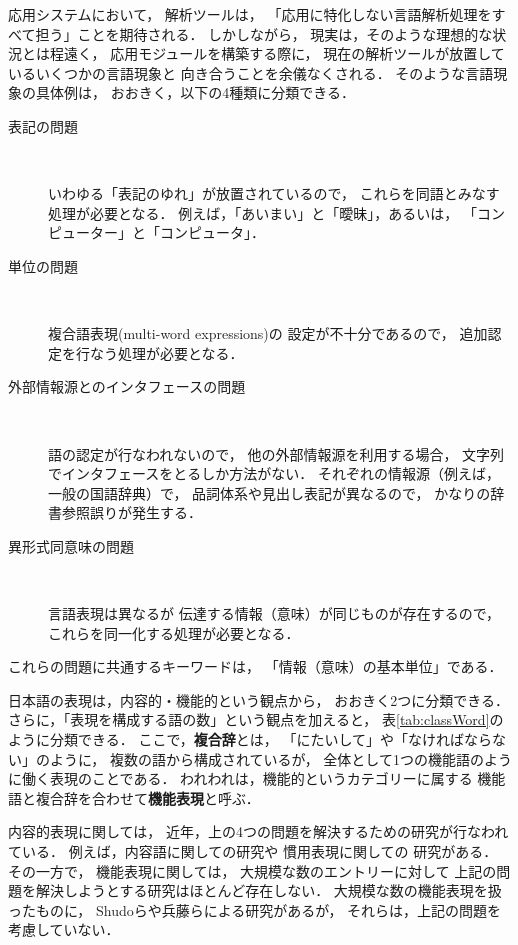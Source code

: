 \documentclass[japanese]{jnlp_1.3e}
\begin{document}
応用システムにおいて，
解析ツールは，
「応用に特化しない言語解析処理をすべて担う」ことを期待される．
しかしながら，
現実は，そのような理想的な状況とは程遠く，
応用モジュールを構築する際に，
現在の解析ツールが放置しているいくつかの言語現象と
向き合うことを余儀なくされる．
そのような言語現象の具体例は，
おおきく，以下の4種類に分類できる．
\begin{description}
 \item[表記の問題] ~~

            いわゆる「表記のゆれ」が放置されているので，
            これらを同語とみなす処理が必要となる．
            例えば，「あいまい」と「曖昧」，あるいは，
            「コンピューター」と「コンピュータ」．            
 \item[単位の問題] ~~

            複合語表現(multi-word expressions)の
            設定が不十分であるので，
            追加認定を行なう処理が必要となる．
 \item[外部情報源とのインタフェースの問題] ~~

            語の認定が行なわれないので，
	    他の外部情報源を利用する場合，
	    文字列でインタフェースをとるしか方法がない．
	    それぞれの情報源（例えば，一般の国語辞典）で，
	    品詞体系や見出し表記が異なるので，
	    かなりの辞書参照誤りが発生する．
 \item[異形式同意味の問題] ~~

            言語表現は異なるが
            伝達する情報（意味）が同じものが存在するので，
            これらを同一化する処理が必要となる．
\end{description}
これらの問題に共通するキーワードは，
「情報（意味）の基本単位」である．

日本語の表現は，内容的・機能的という観点から，
おおきく2つに分類できる．
さらに，「表現を構成する語の数」という観点を加えると，
表\ref{tab:classWord}のように分類できる．
ここで，{\bf 複合辞}とは，
「にたいして」や「なければならない」のように，
複数の語から構成されているが，
全体として1つの機能語のように働く表現のことである．
われわれは，機能的というカテゴリーに属する
機能語と複合辞を合わせて{\bf 機能表現}と呼ぶ．

\begin{table}[b]

\end{table}

内容的表現に関しては，
近年，上の4つの問題を解決するための研究が行なわれている．
例えば，内容語に関しての研究や
慣用表現に関しての
研究がある．
その一方で，
機能表現に関しては，
大規模な数のエントリーに対して
上記の問題を解決しようとする研究はほとんど存在しない．
大規模な数の機能表現を扱ったものに，
Shudoらや兵藤らによる研究があるが，
それらは，上記の問題を考慮していない．
\end{document}
